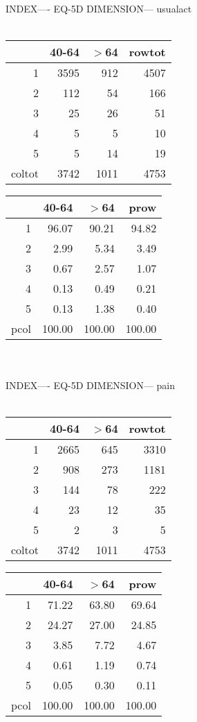 \documentclass[11pt]{article}
\begin{document}
\\\\ 
INDEX---- EQ-5D DIMENSION--- usualact 
 \\\\ 
% 
\begin{tabular}{rrr|r}
  \hline
 & 40-64 & $>$64 & rowtot \\ 
  \hline
1 & 3595 & 912 & 4507 \\ 
  2 & 112 & 54 & 166 \\ 
  3 & 25 & 26 & 51 \\ 
  4 & 5 & 5 & 10 \\ 
  5 & 5 & 14 & 19 \\ 
  coltot & 3742 & 1011 & 4753 \\ 
   \hline
\end{tabular}
% 
\begin{tabular}{rrr|r}
  \hline
 & 40-64 & $>$64 & prow \\ 
  \hline
1 & 96.07 & 90.21 & 94.82 \\ 
  2 & 2.99 & 5.34 & 3.49 \\ 
  3 & 0.67 & 2.57 & 1.07 \\ 
  4 & 0.13 & 0.49 & 0.21 \\ 
  5 & 0.13 & 1.38 & 0.40 \\ 
  pcol & 100.00 & 100.00 & 100.00 \\ 
   \hline
\end{tabular}
\\\\ 
INDEX---- EQ-5D DIMENSION--- pain 
 \\\\ 
% 
\begin{tabular}{rrr|r}
  \hline
 & 40-64 & $>$64 & rowtot \\ 
  \hline
1 & 2665 & 645 & 3310 \\ 
  2 & 908 & 273 & 1181 \\ 
  3 & 144 & 78 & 222 \\ 
  4 & 23 & 12 & 35 \\ 
  5 & 2 & 3 & 5 \\ 
  coltot & 3742 & 1011 & 4753 \\ 
   \hline
\end{tabular}
% 
\begin{tabular}{rrr|r}
  \hline
 & 40-64 & $>$64 & prow \\ 
  \hline
1 & 71.22 & 63.80 & 69.64 \\ 
  2 & 24.27 & 27.00 & 24.85 \\ 
  3 & 3.85 & 7.72 & 4.67 \\ 
  4 & 0.61 & 1.19 & 0.74 \\ 
  5 & 0.05 & 0.30 & 0.11 \\ 
  pcol & 100.00 & 100.00 & 100.00 \\ 
   \hline
\end{tabular}
\end{document}
